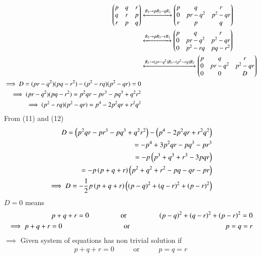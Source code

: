 \documentclass[journal]{IEEEtran}
\begin{document}
\begin{align}
      \begin{pmatrix}
        p & q & r\\
        q & r & p\\
        r & p & q
    \end{pmatrix} &\xleftrightarrow{R_2 \rightarrow pR_2- qR_1} 
    \begin{pmatrix}
        p & q & r \\
        0 & pr-q^2 & p^2-qr \\
        r & p & q 
\end{pmatrix}\\
&\xleftrightarrow{R_3 \rightarrow pR_3- rR_1} \begin{pmatrix}
        p & q & r \\
        0 & pr-q^2 & p^2-qr \\
        0 & p^2-rq & pq-r^2 
\end{pmatrix}\\
&\xleftrightarrow{R_3 \rightarrow (pr-q^2)R_3 - (p^2-rq)R_2} \begin{pmatrix}
        p & q & r \\
        0 & pr-q^2 & p^2-qr \\
        0 & 0 & D 
\end{pmatrix}\\
\implies D=(pr-q^2)(pq-r^2)-(p^2-rq)(p^2-qr)=0\\
\implies (pr-q^2)(pq-r^2)=p^2qr-pr^3-pq^3+q^2r^2\\
\implies (p^2-rq)(p^2-qr)=p^4-2p^2qr+r^2q^2
\end{align}
From (11) and (12)
\begin{align}
    D=\left(p^2qr-pr^3-pq^3+q^2r^2\right)-\left(p^4-2p^2qr+r^2q^2\right)\\
    =-p^4+3p^2qr-pq^3-pr^3\\
    =-p\left(p^3+q^3+r^3-3pqr\right)\\
    =-p\left(p+q+r\right)\left(p^2+q^2+r^2-pq-qr-pr\right)\\
 \implies D  =-\frac{1}{2}p\left(p+q+r\right)\left(\left(p-q\right)^2 + \left(q-r\right)^2 + \left(p-r\right)^2\right)
\end{align}
$D=0$ means 
\begin{align}
    p+q+r=0 \hspace{1.5cm} \text{ or }\hspace{1.5cm} \brak{p-q}^2 + \brak{q-r}^2 + \brak{p-r}^2=0\\
    \implies  p+q+r=0 \hspace{3cm} \text{ or }\hspace{4.7cm} p=q=r
    \end{align}
 $\implies$ Given system of equations has non trivial solution if
 \begin{align}
     p+q+r=0 \hspace{1cm} \text{ or }\hspace{1cm} p=q=r
 \end{align}
\end{document}
